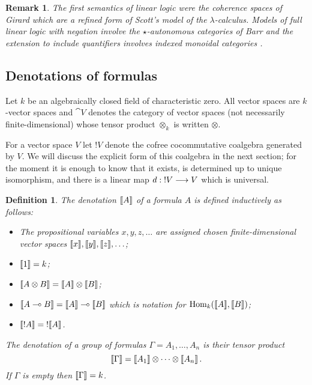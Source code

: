 \documentclass[english,letter paper,12pt,reqno]{article}
\theoremstyle{example}
\newtheorem{definition}[theorem]{Definition}
\newtheorem{remark}[theorem]{Remark}
\def\Hom{\operatorname{Hom}}
\begin{document}
\begin{remark} The first semantics of linear logic were the coherence spaces of Girard \cite[\S 3]{girard_llogic} which are a refined form of Scott's model of the $\lambda$-calculus. Models of full linear logic with negation involve the $\star$-autonomous categories of Barr \cite{barr_auto,barr_acc,barr_autolin} and the extension to include quantifiers involves indexed monoidal categories \cite{seely}.
\end{remark}

\subsection{Denotations of formulas}\label{section:denote_formula}

Let $k$ be an algebraically closed field of characteristic zero. All vector spaces are $k$-vector spaces and $\cat{V}$ denotes the category of vector spaces (not necessarily finite-dimensional) whose tensor product $\otimes_k$ is written $\otimes$.

For a vector space $V$ let ${!} V$ denote the cofree cocommutative coalgebra generated by $V$. We will discuss the explicit form of this coalgebra in the next section; for the moment it is enough to know that it exists, is determined up to unique isomorphism, and there is a linear map $d: {!} V \longrightarrow V$ which is universal.

\begin{definition}\label{defn:denotation_objects} The \emph{denotation} $\llbracket A \rrbracket$ of a formula $A$ is defined inductively as follows:
\begin{itemize}
\item The propositional variables $x, y, z, \ldots$ are assigned chosen finite-dimensional vector spaces $\llbracket x \rrbracket, \llbracket y \rrbracket, \llbracket z \rrbracket, \ldots$;
\item $\llbracket 1 \rrbracket = k$;
\item $\llbracket A \otimes B \rrbracket = \llbracket A \rrbracket \otimes \llbracket B \rrbracket$;
\item $\llbracket A \multimap B \rrbracket = \llbracket A \rrbracket \multimap \llbracket B \rrbracket$ which is notation for $\Hom_k(\den{A}, \den{B})$;
\item $\llbracket !A \rrbracket = {!} \llbracket A \rrbracket$.
\end{itemize}
The denotation of a group of formulas $\Gamma = A_1,\ldots,A_n$ is their tensor product
\[
\llbracket \Gamma \rrbracket = \llbracket A_1 \rrbracket \otimes \cdots \otimes \llbracket A_n \rrbracket\,.
\]
If $\Gamma$ is empty then $\llbracket \Gamma \rrbracket = k$.
\end{definition}
\end{document}
